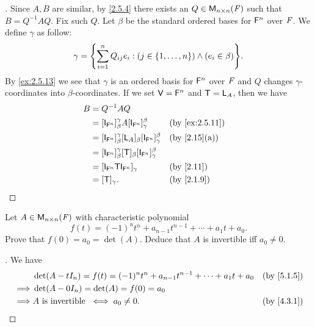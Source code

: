 \begin{proof}[]
  Since \(A, B\) are similar, by \cref{2.5.4} there exists an \(Q \in \mathsf{M}_{{n} \times n}({\mathit{F}})\) such that \(B = Q^{-1} A Q\).
  Fix such \(Q\).
  Let \(\beta\) be the standard ordered bases for \(\mathsf{F}^n\) over \(\mathit{F}\).
  We define \(\gamma\) as follow:
  \[
    \gamma = \set{\sum_{i = 1}^n Q_{i j} e_i : (j \in \set{1, \dots, n}) \land (e_i \in \beta)}.
  \]
  By \cref{ex:2.5.13} we see that \(\gamma\) is an ordered basis for \(\mathsf{F}^n\) over \(\mathit{F}\) and \(Q\) changes \(\gamma\)-coordinates into \(\beta\)-coordinates.
  If we set \(\mathsf{V} = \mathsf{F}^n\) and \(\mathsf{T} = \mathsf{L}_A\), then we have
  \begin{align*}
    B & = Q^{-1} A Q                                                                                                         \\
      & = [\IT[\vs{F}^n]]_{\beta}^{\gamma} A [\IT[\vs{F}^n]]_{\gamma}^{\beta}              &  & \text{(by \cref{ex:2.5.11})} \\
      & = [\IT[\vs{F}^n]]_{\beta}^{\gamma} [\L_A]_{\beta} [\IT[\vs{F}^n]]_{\gamma}^{\beta} &  & \text{(by \cref{2.15}(a))}   \\
      & = [\IT[\vs{F}^n]]_{\beta}^{\gamma} [\T]_{\beta} [\IT[\vs{F}^n]]_{\gamma}^{\beta}                                     \\
      & = [\IT[\vs{F}^n] \T \IT[\vs{F}^n]]_{\gamma}                                        &  & \text{(by \cref{2.11})}      \\
      & = [\T]_{\gamma}.                                                                   &  & \text{(by \cref{2.1.9})}
  \end{align*}
\end{proof}

\begin{ex}\label{ex:5.1.20}
  Let \(A \in \mathsf{M}_{{n} \times n}({\mathit{F}})\) with characteristic polynomial
  \[
    f(t) = (-1)^n t^n + a_{n - 1} t^{n - 1} + \cdots + a_1 t + a_0.
  \]
  Prove that \(f(0) = a_0 = \det(A)\).
  Deduce that \(A\) is invertible iff \(a_0 \neq 0\).
\end{ex}

\begin{proof}[]
  We have
  \begin{align*}
             & \det(A - t I_n) = f(t) = (-1)^n t^n + a_{n - 1} t^{n - 1} + \cdots + a_1 t + a_0 &  & \text{(by \cref{5.1.5})} \\
    \implies & \det(A - 0 I_n) = \det(A) = f(0) = a_0                                                                         \\
    \implies & A \text{ is invertible } \iff a_0 \neq 0.                                        &  & \text{(by \cref{4.3.1})}
  \end{align*}
\end{proof}
